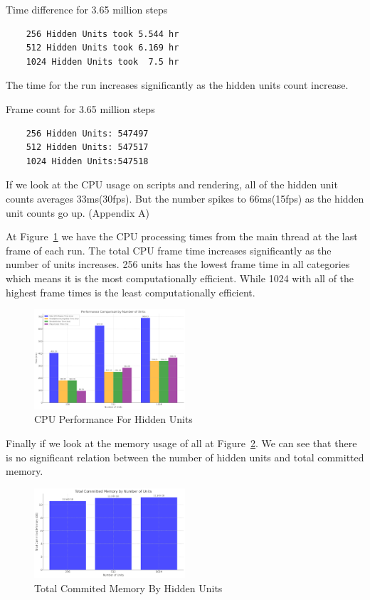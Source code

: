 \documentclass{LSkill}
\begin{document}
Time difference for 3.65 million steps

\begin{verbatim}
    256 Hidden Units took 5.544 hr		
    512 Hidden Units took 6.169 hr
    1024 Hidden Units took  7.5 hr
\end{verbatim}

The time for the run increases significantly as the hidden units count increase.

Frame count for 3.65 million steps
\begin{verbatim}
    256 Hidden Units: 547497		
    512 Hidden Units: 547517
    1024 Hidden Units:547518
\end{verbatim}

If we look at the CPU usage on scripts and rendering, all of the hidden unit counts averages 33ms(30fps). But the number spikes to 66ms(15fps)  as the hidden unit counts go up. 
(Appendix A)

\vspace{0.5cm}

At Figure~\ref{fig:CPU Performance For Hidden Units} we have the CPU processing times from the main thread at the last frame of each run. The total CPU frame time increases significantly as the number of units increases. 256 units has the lowest frame time in all categories which means it is the most computationally efficient. While 1024 with all of the highest frame times is the least computationally efficient.


\begin{figure}[htbp]
    \centering
    \includegraphics[width=0.5\textwidth]{figure 10.png} 
    \caption{CPU Performance For Hidden Units}
    \label{fig:CPU Performance For Hidden Units}
\end{figure}

Finally if we look at the memory usage of all at Figure~\ref{fig:Total Commited Memory By Hidden Units}. We can see that there is no significant relation between the number of hidden units and total committed memory.

\begin{figure}[htbp]
    \centering
    \includegraphics[width=0.5\textwidth]{figure 11.png} 
    \caption{Total Commited Memory By Hidden Units}
    \label{fig:Total Commited Memory By Hidden Units}
\end{figure}
\end{document}
